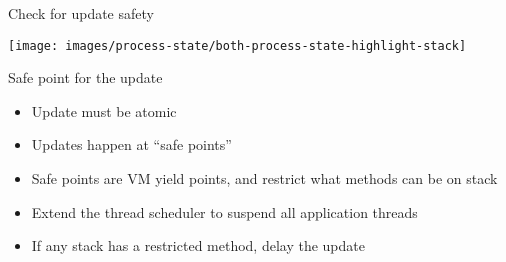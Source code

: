 \begin{frame}{Check for update safety}%
\vspace*{-3mm}%
\begin{center}%
\texttt{[image: images/process-state/both-process-state-highlight-stack]}%
\end{center}%
\end{frame}

\begin{frame}[t,label=suspend]{Safe point for the update}%
\begin{itemize}
\item Update must be atomic
\item Updates happen at ``safe points''\\
\item Safe points are VM yield points, and restrict what methods can be on
      stack
\item Extend the thread scheduler to suspend all application threads
\item If any stack has a restricted method, delay the update
\end{itemize}
\end{frame}


